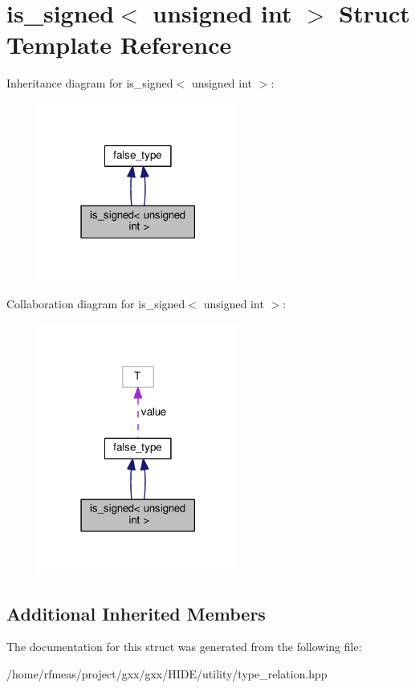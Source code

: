 \hypertarget{structis__signed_3_01unsigned_01int_01_4}{}\section{is\+\_\+signed$<$ unsigned int $>$ Struct Template Reference}
\label{structis__signed_3_01unsigned_01int_01_4}


Inheritance diagram for is\+\_\+signed$<$ unsigned int $>$\+:
\nopagebreak
\begin{figure}[H]
\begin{center}
\leavevmode
\includegraphics[width=186pt]{structis__signed_3_01unsigned_01int_01_4__inherit__graph}
\end{center}
\end{figure}


Collaboration diagram for is\+\_\+signed$<$ unsigned int $>$\+:
\nopagebreak
\begin{figure}[H]
\begin{center}
\leavevmode
\includegraphics[width=186pt]{structis__signed_3_01unsigned_01int_01_4__coll__graph}
\end{center}
\end{figure}
\subsection*{Additional Inherited Members}


The documentation for this struct was generated from the following file\+:\begin{DoxyCompactItemize}
\item 
/home/rfmeas/project/gxx/gxx/\+H\+I\+D\+E/utility/type\+\_\+relation.\+hpp\end{DoxyCompactItemize}
